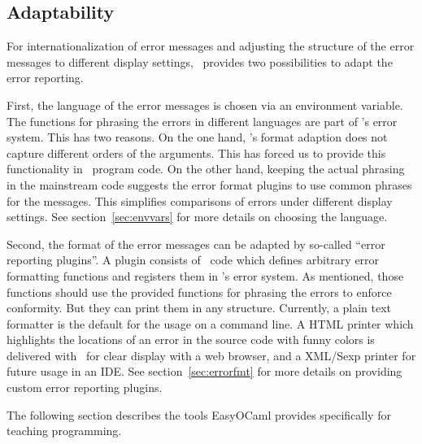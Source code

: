 \subsection{Adaptability}

For internationalization of error messages and adjusting the structure of the
error messages to different display settings, \easyocaml\ provides two
possibilities to adapt the error reporting.

First, the language of the error messages is chosen via an environment variable.
The functions for phrasing the errors in different languages are part of
\easyocaml's error system. This has two reasons. On the one hand, \ocaml's
format adaption does not capture different orders of the arguments. This has
forced us to provide this functionality in \ocaml\ program code.
On the other hand, keeping the actual phrasing in the mainstream code suggests
the error format plugins to use common phrases for the messages.
This simplifies comparisons of errors under different display settings.
See section~\ref{sec:envvars} for more details on choosing the language.

Second, the format of the error messages can be adapted by so-called ``error
reporting plugins''.
A plugin consists of \ocaml\ code which defines arbitrary error formatting
functions and registers them in \easyocaml's error system.
As mentioned, those functions should use the provided functions for phrasing the
errors to enforce conformity. But they can print them in any structure.
Currently, a plain text formatter is the default for the usage on a command
line.
A HTML printer which highlights the locations of an error in the source code
with funny colors is delivered with \easyocaml\ for clear display with a
web browser, and a XML/Sexp printer for future usage in an IDE.
See section~\ref{sec:errorfmt} for more details on providing custom error
reporting plugins.

The following section describes the tools EasyOCaml provides specifically for
teaching programming.
